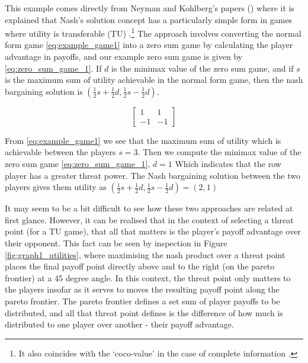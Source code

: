 This example comes directly from Neyman and Kohlberg's papers (\cite{value2,value1}) where it is explained that Nash's solution concept has a particularly simple form in games where utility is transferable (TU) \cite{value2,shap_lectures,value1}.\footnote{It also coincides with the `coco-value' in the case of complete information \cite{kalai1,Kalai2010}.}
The approach involves converting the normal form game \eqref{eq:example_game1} into a zero sum game by calculating the player advantage in payoffs, and our example zero sum game is given by \eqref{eq:zero_sum_game_1}.
If $d$ is the minimax value of the zero sum game, and if $s$ is the maximum sum of utility achievable in the normal form game, then the nash bargaining solution is $(\frac{1}{2}s+\frac{1}{2}d,\frac{1}{2}s-\frac{1}{2}d)$.

\begin{equation}\label{eq:zero_sum_game_1} \begin{bmatrix}1 & 1\\ -1 & -1\end{bmatrix} \end{equation}

\begin{solution}[TU approach]
From \eqref{eq:example_game1} we see that the maximum sum of utility which is achievable between the players $s=3$. Then we compute the minimax value of the zero sum game \eqref{eq:zero_sum_game_1}, $d=1$ Which indicates that the row player has a greater threat power.
The Nash bargaining solution between the two players gives them utility as $(\frac{1}{2}s+\frac{1}{2}d,\frac{1}{2}s-\frac{1}{2}d) = (2,1)$
\end{solution}

It may seem to be a bit difficult to see how these two approaches are related at first glance.
However, it can be realised that in the context of selecting a threat point (for a TU game), that all that matters is the player's payoff advantage over their opponent.
This fact can be seen by inspection in Figure \ref{fig:graph1_utilities}, where maximising the nash product over a threat point places the final payoff point directly above and to the right (on the pareto frontier) at a 45 degree angle.
In this context, the threat point only matters to the players insofar as it serves to moves the resulting payoff point along the pareto frontier.
The pareto frontier defines a set sum of player payoffs to be distributed, and all that threat point defines is the difference of how much is distributed to one player over another - their payoff advantage.\\


